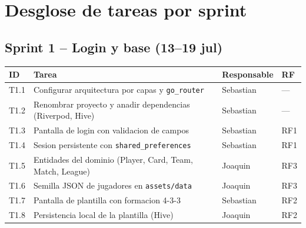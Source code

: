 \documentclass[11pt,a4paper]{article}
\begin{document}
\section{Desglose de tareas por sprint}

\subsection{Sprint 1 -- Login y base (13--19 jul)}
\renewcommand{\arraystretch}{1.3}
\begin{longtable}{@{}C{1.2cm} L{7.6cm} L{3.4cm} C{2.2cm}@{}}
\toprule
\textbf{ID} & \textbf{Tarea} & \textbf{Responsable} & \textbf{RF} \\
\midrule
\endhead
T1.1 & Configurar arquitectura por capas y \texttt{go\_router} & Sebastian & --- \\
T1.2 & Renombrar proyecto y anadir dependencias (Riverpod, Hive) & Sebastian & --- \\
T1.3 & Pantalla de login con validacion de campos & Sebastian & RF1 \\
T1.4 & Sesion persistente con \texttt{shared\_preferences} & Sebastian & RF1 \\
T1.5 & Entidades del dominio (Player, Card, Team, Match, League) & Joaquin & RF3 \\
T1.6 & Semilla JSON de jugadores en \texttt{assets/data} & Joaquin & RF3 \\
T1.7 & Pantalla de plantilla con formacion 4-3-3 & Sebastian & RF2 \\
T1.8 & Persistencia local de la plantilla (Hive) & Joaquin & RF2 \\
\bottomrule
\end{longtable}
\end{document}
